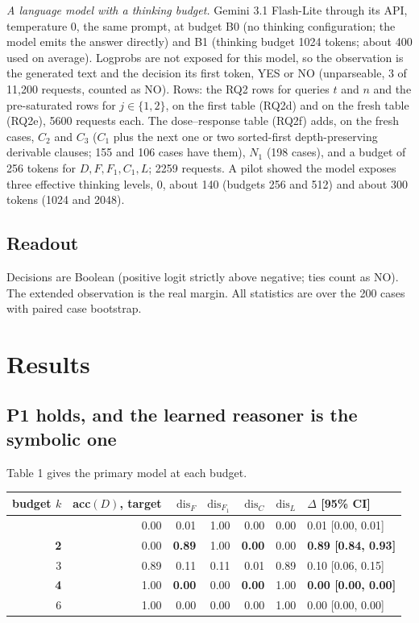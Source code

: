 \emph{A language model with a thinking budget.} Gemini 3.1 Flash-Lite through its API, temperature 0, the same prompt, at budget B0 (no thinking configuration; the model emits the answer directly) and B1 (thinking budget 1024 tokens; about 400 used on average). Logprobs are not exposed for this model, so the observation is the generated text and the decision its first token, YES or NO (unparseable, 3 of 11,200 requests, counted as NO). Rows: the RQ2 rows for queries \(t\) and \(n\) and the pre-saturated rows for \(j\in\{1,2\}\), on the first table (RQ2d) and on the fresh table (RQ2e), 5600 requests each. The dose--response table (RQ2f) adds, on the fresh cases, \(C_2\) and \(C_3\) (\(C_1\) plus the next one or two sorted-first depth-preserving derivable clauses; 155 and 106 cases have them), \(N_1\) (198 cases), and a budget of 256 tokens for \(D,F,F_1,C_1,L\); 2259 requests. A pilot showed the model exposes three effective thinking levels, 0, about 140 (budgets 256 and 512) and about 300 tokens (1024 and 2048).

\subsection{Readout}\label{readout}

Decisions are Boolean (positive logit strictly above negative; ties count as NO). The extended observation is the real margin. All statistics are over the 200 cases with paired case bootstrap.

\section{Results}\label{results}

\subsection{P1 holds, and the learned reasoner is the symbolic one}\label{p1-holds-and-the-learned-reasoner-is-the-symbolic-one}

Table 1 gives the primary model at each budget.

{\def\LTcaptype{none} %
\begin{longtable}[]{@{}rrrrrrl@{}}
\toprule\noalign{}
budget \(k\) & acc\((D)\), target & \(\mathrm{dis}_F\) & \(\mathrm{dis}_{F_1}\) & \(\mathrm{dis}_C\) & \(\mathrm{dis}_L\) & \(\Delta\) {[}95\% CI{]} \\
\midrule\noalign{}
\endhead
\bottomrule\noalign{}
\endlastfoot
1 & 0.00 & 0.01 & 1.00 & 0.00 & 0.00 & 0.01 {[}0.00, 0.01{]} \\
\textbf{2} & 0.00 & \textbf{0.89} & 1.00 & \textbf{0.00} & 0.00 & \textbf{0.89 {[}0.84, 0.93{]}} \\
3 & 0.89 & 0.11 & 0.11 & 0.01 & 0.89 & 0.10 {[}0.06, 0.15{]} \\
\textbf{4} & 1.00 & \textbf{0.00} & 0.00 & \textbf{0.00} & 1.00 & \textbf{0.00 {[}0.00, 0.00{]}} \\
6 & 1.00 & 0.00 & 0.00 & 0.00 & 1.00 & 0.00 {[}0.00, 0.00{]} \\
\end{longtable}
}

